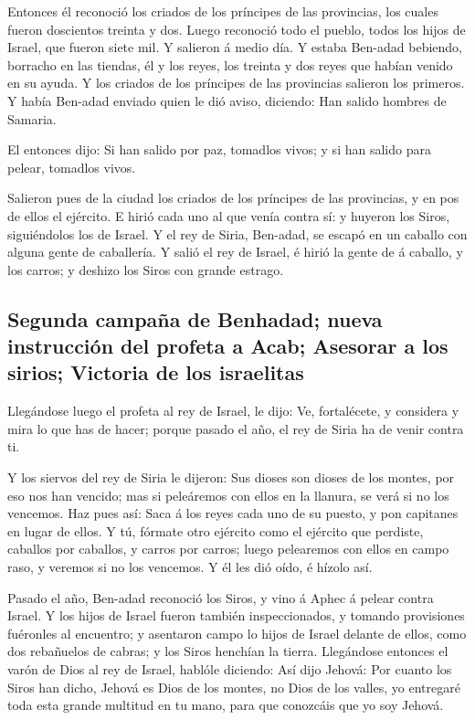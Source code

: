  Entonces él reconoció los criados de los príncipes de las
provincias, los cuales fueron doscientos treinta y dos. Luego reconoció
todo el pueblo, todos los hijos de Israel, que fueron siete mil.
 Y salieron á medio día. Y estaba Ben-adad bebiendo,
borracho en las tiendas, él y los reyes, los treinta y dos reyes que
habían venido en su ayuda.  Y los criados de los príncipes
de las provincias salieron los primeros. Y había Ben-adad enviado quien
le dió aviso, diciendo: Han salido hombres de Samaria.

 El entonces dijo: Si han salido por paz, tomadlos vivos; y
si han salido para pelear, tomadlos vivos.

 Salieron pues de la ciudad los criados de los príncipes de
las provincias, y en pos de ellos el ejército.  E hirió
cada uno al que venía contra sí: y huyeron los Siros, siguiéndolos los
de Israel. Y el rey de Siria, Ben-adad, se escapó en un caballo con
alguna gente de caballería.  Y salió el rey de Israel, é
hirió la gente de á caballo, y los carros; y deshizo los Siros con
grande estrago.

\hypertarget{segunda-campauxf1a-de-benhadad-nueva-instrucciuxf3n-del-profeta-a-acab-asesorar-a-los-sirios-victoria-de-los-israelitas}{%
\subsection{Segunda campaña de Benhadad; nueva instrucción del profeta a
Acab; Asesorar a los sirios; Victoria de los
israelitas}\label{segunda-campauxf1a-de-benhadad-nueva-instrucciuxf3n-del-profeta-a-acab-asesorar-a-los-sirios-victoria-de-los-israelitas}}

 Llegándose luego el profeta al rey de Israel, le dijo: Ve,
fortalécete, y considera y mira lo que has de hacer; porque pasado el
año, el rey de Siria ha de venir contra ti.

 Y los siervos del rey de Siria le dijeron: Sus dioses son
dioses de los montes, por eso nos han vencido; mas si peleáremos con
ellos en la llanura, se verá si no los vencemos.  Haz pues
así: Saca á los reyes cada uno de su puesto, y pon capitanes en lugar de
ellos.  Y tú, fórmate otro ejército como el ejército que
perdiste, caballos por caballos, y carros por carros; luego pelearemos
con ellos en campo raso, y veremos si no los vencemos. Y él les dió
oído, é hízolo así.

 Pasado el año, Ben-adad reconoció los Siros, y vino á
Aphec á pelear contra Israel.  Y los hijos de Israel fueron
también inspeccionados, y tomando provisiones fuéronles al encuentro; y
asentaron campo lo hijos de Israel delante de ellos, como dos rebañuelos
de cabras; y los Siros henchían la tierra.  Llegándose
entonces el varón de Dios al rey de Israel, hablóle diciendo: Así dijo
Jehová: Por cuanto los Siros han dicho, Jehová es Dios de los montes, no
Dios de los valles, yo entregaré toda esta grande multitud en tu mano,
para que conozcáis que yo soy Jehová.

